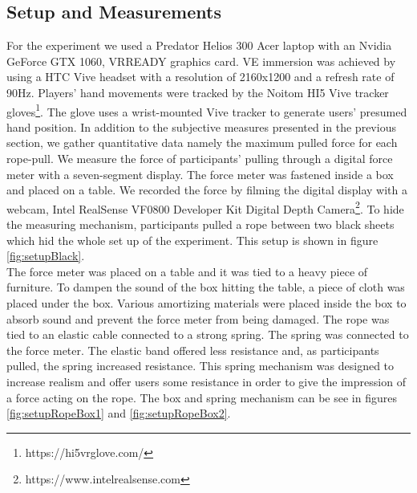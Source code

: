 \subsection{Setup and Measurements}
\label{subsection:SetupMeasurements}
For the experiment we used a Predator Helios 300 Acer laptop with an Nvidia GeForce GTX 1060, VRREADY graphics card. VE immersion was achieved by using a HTC Vive headset with a resolution of 2160x1200 and a refresh rate of 90Hz. 
Players' hand movements were tracked by the Noitom HI5 Vive tracker gloves\footnote{https://hi5vrglove.com/}. The glove uses a wrist-mounted Vive tracker to generate users' presumed hand position. 
In addition to the subjective measures presented in the previous section, we gather quantitative data namely the maximum pulled force for each rope-pull. We measure the force of participants' pulling through a digital force meter with a seven-segment display. The force meter was fastened inside a box and placed on a table. We recorded the force by filming the digital display with a webcam, Intel RealSense VF0800 Developer Kit Digital Depth Camera\footnote{https://www.intelrealsense.com}.
To hide the measuring mechanism, participants pulled a rope between two black sheets which hid the whole set up of the experiment. This setup is shown in figure \ref{fig:setupBlack}.\\
The force meter was placed on a table and it was tied to a heavy piece of furniture. To dampen the sound of the box hitting the table, a piece of cloth was placed under the box. Various amortizing materials were placed inside the box to absorb sound and prevent the force meter from being damaged. The rope was tied to an elastic cable connected to a strong spring. The spring was connected to the force meter. The elastic band offered less resistance and, as participants pulled, the spring increased resistance. This spring mechanism was designed to increase realism and offer users some resistance in order to give the impression of a force acting on the rope. The box and spring mechanism can be see in figures \ref{fig:setupRopeBox1} and \ref{fig:setupRopeBox2}.\\
